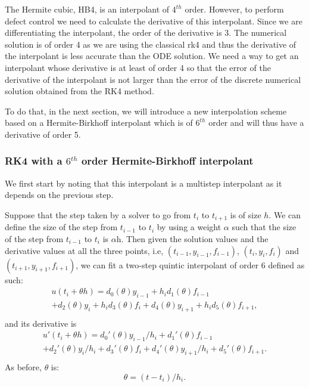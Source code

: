 \documentclass{article}
\begin{document}
The Hermite cubic, HB4, is an interpolant of $4^{th}$ order. However, to perform defect control we need to calculate the derivative of this interpolant. Since we are differentiating the interpolant, the order of the derivative is 3. The numerical solution is of order 4 as we are using the classical rk4 and thus the derivative of the interpolant is less accurate than the ODE solution. We need a way to get an interpolant whose derivative is at least of order 4 so that the error of the derivative of the interpolant is not larger than the error of the discrete numerical solution obtained from the RK4 method.

To do that, in the next section, we will introduce a new interpolation scheme based on a Hermite-Birkhoff interpolant which is of $6^{th}$ order and will thus have a derivative of order 5.

\subsubsection{RK4 with a $6^{th}$ order Hermite-Birkhoff interpolant}
We first start by noting that this interpolant is a multistep interpolant as it depends on the previous step.

Suppose that the step taken by a solver to go from $t_i$ to $t_{i + 1}$ is of size $h$. We can define the size of the step from $t_{i - 1}$ to $t_i$ by using a weight $\alpha$ such that the size of the step from $t_{i - 1}$ to $t_i$ is $\alpha$h. Then given the solution values and the derivative values at all the three points, i.e, $(t_{i-1}, y_{i - 1}, f_{i - 1})$, $(t_i, y_i, f_i)$ and $(t_{i + 1}, y_{i + 1}, f_{i + 1})$, we can fit a two-step quintic interpolant of order 6 defined as such:
\begin{equation}
\begin{split}
u(t_i + \theta h) = d_{0}(\theta) y_{i-1} +  h_id_{1}(\theta)f_{i-1} \\
+ d_{2}(\theta)y_i     +  h_id_{3}(\theta)f_i
+ d_{4}(\theta)y_{i + 1} + h_id_{5}(\theta)f_{i + 1}, \\
\end{split}
\end{equation}
and its derivative is
\begin{equation}
\begin{split}
u'(t_i + \theta h) = d_{0}'(\theta)y_{i-1}/h_i +  d_{1}'(\theta)f_{i-1} \\
+ d_{2}'(\theta)y_i/h_i     +  d_{3}'(\theta)f_i
+ d_{4}'(\theta)y_{i + 1}/h_i + d_{5}'(\theta)f_{i + 1}. \\
\end{split}
\end{equation}
As before, $\theta$ is:
\begin{equation}
\theta = (t - t_i) / h_i.
\end{equation}
\end{document}
